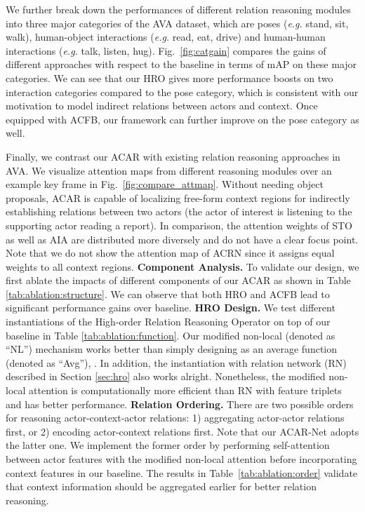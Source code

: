 We further break down the performances of different relation reasoning modules into three major categories of the AVA dataset, which are poses (\textit{e.g.} stand, sit, walk), human-object interactions (\textit{e.g.} read, eat, drive) and human-human interactions (\textit{e.g.} talk, listen, hug). Fig.~\ref{fig:catgain} compares the gains of different approaches with respect to the baseline in terms of mAP on these major categories. We can see that our HRO gives more performance boosts 
on two interaction categories compared to the pose category, which is consistent with our motivation to model indirect relations between actors and context. Once equipped with ACFB, our framework can further improve on the pose category as well.

Finally, we contrast our ACAR with existing relation reasoning approaches in AVA. We visualize attention maps from different reasoning modules over an example key frame in Fig.~\ref{fig:compare_attmap}. Without needing object proposals, ACAR is capable of localizing free-form context regions for indirectly establishing relations between two actors (the actor of interest is listening to the supporting actor reading a report). In comparison, the attention weights of STO as well as AIA are distributed more diversely and do not have a clear focus point. Note that we do not show the attention map of ACRN since it assigns equal weights to all context regions. 
{\flushleft \bf Component Analysis.} To validate our design, we first ablate the impacts of different components of our ACAR as shown in Table \ref{tab:ablation:structure}. We can observe that both HRO and ACFB lead to significant performance gains over baseline. 
{\flushleft \bf HRO Design.} We test different instantiations of the High-order Relation Reasoning Operator on top of our baseline in Table \ref{tab:ablation:function}. 
Our modified non-local (denoted as ``NL'') mechanism works better than simply designing  as an average function (denoted as ``Avg''), \ie . In addition, the instantiation with relation network (RN) described in Section \ref{sec:hro} also works 
alright. Nonetheless, the modified non-local attention is computationally more efficient than RN with feature triplets and has better performance.
{\flushleft \bf Relation Ordering.} There are two possible orders for reasoning actor-context-actor relations: 1) aggregating actor-actor relations first, or 2) encoding actor-context relations first. Note that our ACAR-Net adopts the latter one. We implement the former order by performing self-attention between actor features with the modified non-local attention before incorporating context features in our baseline. The results in Table~\ref{tab:ablation:order} validate that context information should be aggregated earlier for better relation reasoning.
